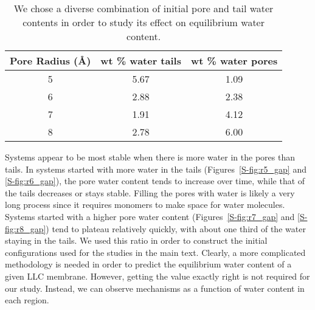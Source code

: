   \begin{table}[!htb]
  \centering
  \begin{tabular}{|c|c|c|}
  \hline
  Pore Radius (\AA) & wt \% water tails & wt \% water pores \\
  \hline
  5                 &        5.67       &     1.09          \\
  6                 &        2.88       &     2.38          \\
  7                 &        1.91       &     4.12          \\
  8                 &        2.78       &     6.00          \\
  \hline
  \end{tabular}
  \caption{We chose a diverse combination of initial pore and tail water
  contents in order to study its effect on equilibrium water
  content.}\label{S-table:water_content}
  \end{table}

  Systems appear to be most stable when there is more water in the pores than
  tails. In systems started with more water in the tails
  (Figures~\ref{S-fig:r5_gap} and \ref{S-fig:r6_gap}), the pore water content tends
  to increase over time, while that of the tails decreases or stays stable.
  Filling the pores with water is likely a very long process since it requires
  monomers to make space for water molecules. Systems started with a higher pore
  water content (Figures~\ref{S-fig:r7_gap} and \ref{S-fig:r8_gap}) tend to plateau
  relatively quickly, with about one third of the water staying in the tails.  We
  used this ratio in order to construct the initial configurations used for the
  studies in the main text.  Clearly, a more complicated methodology is needed in
  order to predict the equilibrium water content of a given LLC membrane.
  However, getting the value exactly right is not required for our study.
  Instead, we can observe mechanisms as a function of water content in each
  region. 

